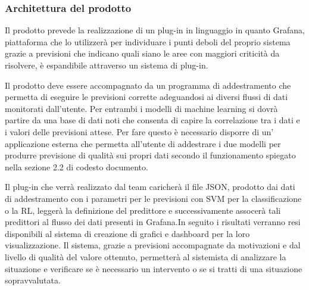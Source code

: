 \documentclass[../analisi-dei-requisiti.tex]{subfiles}
\begin{document}
	\subsubsection{Architettura del prodotto}
	\label{subs:architettura_del_prodotto}
		Il prodotto prevede la realizzazione di un plug-in in linguaggio  in quanto Grafana, piattaforma che lo utilizzerà per individuare i punti deboli del proprio sistema grazie a previsioni che indicano quali siano le aree con maggiori criticità da risolvere, è espandibile attraverso un sistema di plug-in.

	\label{subs:programma_di_addestramento} 
		Il prodotto deve essere accompagnato da un programma di addestramento che permetta di eseguire le previsioni corrette adeguandosi ai diversi flussi di dati monitorati dall'utente. Per entrambi i modelli di machine learning si dovrà partire da una base di dati noti che consenta di capire la correlazione tra i dati e i valori delle previsioni attese. Per fare questo è necessario disporre di un' applicazione esterna che permetta all'utente di addestrare i due modelli per produrre previsione di qualità sui propri dati secondo il funzionamento spiegato nella sezione 2.2 di codesto documento.

	\label{subs:plug-in_di_previsione}
		Il plug-in che verrà realizzato dal team caricherà il file JSON, prodotto dai dati di addestramento con i parametri per le previsioni con SVM per la classificazione o la RL, leggerà la definizione del predittore e successivamente assocerà tali predittori al flusso dei dati presenti in Grafana.In seguito i risultati verranno resi disponibili al sistema di creazione di grafici e dashboard per la loro visualizzazione. Il sistema, grazie a previsioni accompagnate da motivazioni e dal livello di qualità del valore ottenuto, permetterà al sistemista di analizzare la situazione e verificare se è necessario un intervento o se si tratti di una situazione sopravvalutata. 
	 
\end{document}
